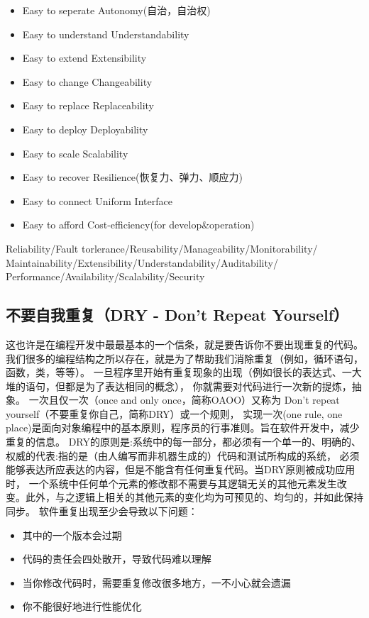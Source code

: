 \documentclass{book}
\begin{document}
\begin{itemize}
\item{Easy to seperate \textrightarrow Autonomy(自治，自治权)}
\item{Easy to understand \textrightarrow Understandability}
\item{Easy to extend \textrightarrow Extensibility}
\item{Easy to change \textrightarrow Changeability}
\item{Easy to replace \textrightarrow Replaceability}
\item{Easy to deploy \textrightarrow Deployability}
\item{Easy to scale \textrightarrow Scalability}
\item{Easy to recover \textrightarrow Resilience(恢复力、弹力、顺应力)}
\item{Easy to connect \textrightarrow Uniform Interface}
\item{Easy to afford \textrightarrow Cost-efficiency(for develop\&operation)}
\end{itemize}

Reliability/Fault torlerance/Reusability/Manageability/Monitorability/
Maintainability/Extensibility/Understandability/Auditability/
Performance/Availability/Scalability/Security

\subsection{不要自我重复（DRY - Don’t Repeat Yourself）}

这也许是在编程开发中最最基本的一个信条，就是要告诉你不要出现重复的代码。
我们很多的编程结构之所以存在，就是为了帮助我们消除重复（例如，循环语句，函数，类，等等）。
一旦程序里开始有重复现象的出现（例如很长的表达式、一大堆的语句，但都是为了表达相同的概念），
你就需要对代码进行一次新的提炼，抽象。
一次且仅一次（once and only once，简称OAOO）又称为 Don't repeat yourself（不要重复你自己，简称DRY）或一个规则，
实现一次(one rule, one place)是面向对象编程中的基本原则，程序员的行事准则。旨在软件开发中，减少重复的信息。
DRY的原则是:系统中的每一部分，都必须有一个单一的、明确的、权威的代表:指的是（由人编写而非机器生成的）代码和测试所构成的系统，
必须能够表达所应表达的内容，但是不能含有任何重复代码。当DRY原则被成功应用时，
一个系统中任何单个元素的修改都不需要与其逻辑无关的其他元素发生改变。此外，与之逻辑上相关的其他元素的变化均为可预见的、均匀的，并如此保持同步。
软件重复出现至少会导致以下问题： 

\begin{itemize}
	\item{其中的一个版本会过期}
	\item{代码的责任会四处散开，导致代码难以理解}
	\item{当你修改代码时，需要重复修改很多地方，一不小心就会遗漏}
	\item{你不能很好地进行性能优化}
\end{itemize}
\end{document}
